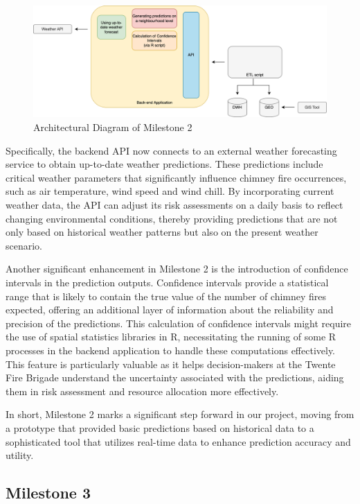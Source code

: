 \documentclass{utitcphd_overleaf}
\begin{document}
\begin{figure}[ht]
  \centering
  \includegraphics[width=1\textwidth]{my_images/milestones/iteration_2_arch.png}
  \caption{Architectural Diagram of Milestone 2}
  \label{fig:iteration_2_arch}
\end{figure}

Specifically, the backend API now connects to an external weather forecasting service to obtain up-to-date weather predictions. These predictions include critical weather parameters that significantly influence chimney fire occurrences, such as air temperature, wind speed and wind chill. By incorporating current weather data, the API can adjust its risk assessments on a daily basis to reflect changing environmental conditions, thereby providing predictions that are not only based on historical weather patterns but also on the present weather scenario.

Another significant enhancement in Milestone 2 is the introduction of confidence intervals in the prediction outputs. Confidence intervals provide a statistical range that is likely to contain the true value of the number of chimney fires expected, offering an additional layer of information about the reliability and precision of the predictions. This calculation of confidence intervals might require the use of spatial statistics libraries in R, necessitating the running of some R processes in the backend application to handle these computations effectively. This feature is particularly valuable as it helps decision-makers at the Twente Fire Brigade understand the uncertainty associated with the predictions, aiding them in risk assessment and resource allocation more effectively.

In short, Milestone 2 marks a significant step forward in our project, moving from a prototype that provided basic predictions based on historical data to a sophisticated tool that utilizes real-time data to enhance prediction accuracy and utility.

\subsection{Milestone 3}
\end{document}
